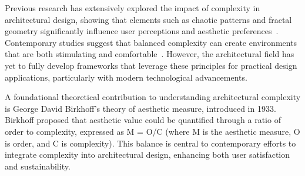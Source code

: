 

Previous research has extensively explored the impact of complexity in architectural design, showing that elements such as chaotic patterns and fractal geometry significantly influence user perceptions and aesthetic preferences~\cite{Bies2016}.
Contemporary studies suggest that balanced complexity can create environments that are both stimulating and comfortable~\cite{Redies2015}.
However, the architectural field has yet to fully develop frameworks that leverage these principles for practical design applications, particularly with modern technological advancements.

A foundational theoretical contribution to understanding architectural complexity is George David Birkhoff's theory of aesthetic measure, introduced in 1933.
Birkhoff proposed that aesthetic value could be quantified through a ratio of order to complexity, expressed as M = O/C (where M is the aesthetic measure, O is order, and C is complexity)\cite{Douchova2016}.
This balance is central to contemporary efforts to integrate complexity into architectural design, enhancing both user satisfaction and sustainability.

